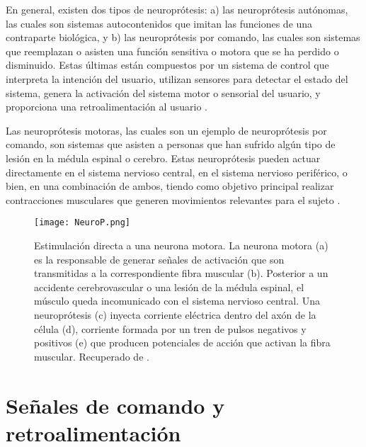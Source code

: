 
En general, existen dos tipos de neuroprótesis: a) las neuroprótesis autónomas, las cuales son sistemas autocontenidos que imitan las funciones de una contraparte biológica, y b) las neuroprótesis por comando, las cuales son sistemas que reemplazan o asisten una función sensitiva o motora que se ha perdido o disminuido. Estas últimas están compuestos por un sistema de control que interpreta la intención del usuario, utilizan sensores para detectar el estado del sistema, genera la activación del sistema motor o sensorial del usuario, y proporciona una retroalimentación al usuario \cite{Popovic2015}.

Las neuroprótesis motoras, las cuales son un ejemplo de neuroprótesis por comando, son sistemas que asisten a personas que han sufrido algún tipo de lesión en la médula espinal o cerebro. Estas neuroprótesis pueden actuar directamente en el sistema nervioso central, en el sistema nervioso periférico, o bien, en una combinación de ambos, tiendo como objetivo principal realizar contracciones musculares que generen movimientos relevantes para el sujeto \cite{Popovic2015}.

\begin{figure}[htbp]
	\centering
	\texttt{[image: NeuroP.png]}
	\caption[Estimulación directa a una neurona motora]{Estimulación directa a una neurona motora. La neurona motora (a) es la responsable de generar señales de activación que son transmitidas a la correspondiente fibra muscular (b). Posterior a un accidente cerebrovascular o una lesión de la médula espinal, el músculo queda incomunicado con el sistema nervioso central. Una neuroprótesis (c) inyecta corriente eléctrica dentro del axón de la célula (d), corriente formada por un tren de pulsos negativos y positivos (e) que producen potenciales de acción que activan la fibra muscular. Recuperado de \cite{Popovic2008}.}
	\label{Figura: NeuroP}
\end{figure}

\section{Señales de comando y retroalimentación}\label{Seccion: ComRetro}

